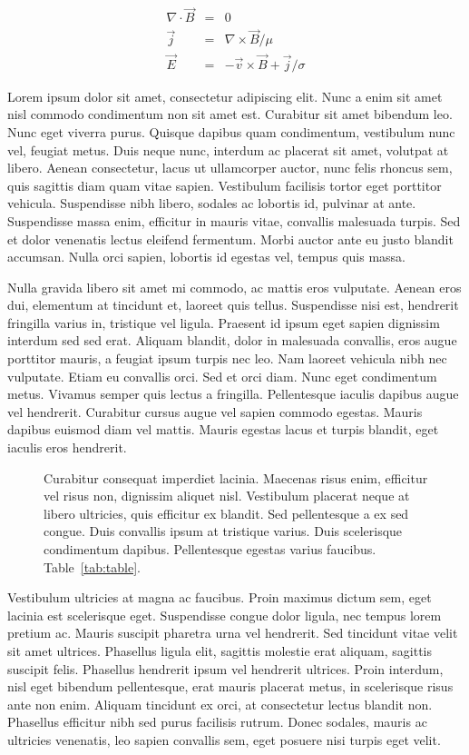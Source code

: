 \documentclass[]{aastex61}
\begin{document}
\begin{eqnarray} \label{eqn:other}
\nabla \cdot \vec{B} &=& 0 \\
\vec{j} &=& \nabla \times \vec{B} / \mu \\
\vec{E} &=& - \vec{v} \times \vec{B} + \vec{j} / \sigma
\end{eqnarray}


Lorem ipsum dolor sit amet, consectetur adipiscing elit. Nunc a enim sit amet nisl commodo condimentum non sit amet est. Curabitur sit amet bibendum leo. Nunc eget viverra purus. Quisque dapibus quam condimentum, vestibulum nunc vel, feugiat metus. Duis neque nunc, interdum ac placerat sit amet, volutpat at libero. Aenean consectetur, lacus ut ullamcorper auctor, nunc felis rhoncus sem, quis sagittis diam quam vitae sapien. Vestibulum facilisis tortor eget porttitor vehicula. Suspendisse nibh libero, sodales ac lobortis id, pulvinar at ante. Suspendisse massa enim, efficitur in mauris vitae, convallis malesuada turpis. Sed et dolor venenatis lectus eleifend fermentum. Morbi auctor ante eu justo blandit accumsan. Nulla orci sapien, lobortis id egestas vel, tempus quis massa.

Nulla gravida libero sit amet mi commodo, ac mattis eros vulputate. Aenean eros dui, elementum at tincidunt et, laoreet quis tellus. Suspendisse nisi est, hendrerit fringilla varius in, tristique vel ligula. Praesent id ipsum eget sapien dignissim interdum sed sed erat. Aliquam blandit, dolor in malesuada convallis, eros augue porttitor mauris, a feugiat ipsum turpis nec leo. Nam laoreet vehicula nibh nec vulputate. Etiam eu convallis orci. Sed et orci diam. Nunc eget condimentum metus. Vivamus semper quis lectus a fringilla. Pellentesque iaculis dapibus augue vel hendrerit. Curabitur cursus augue vel sapien commodo egestas. Mauris dapibus euismod diam vel mattis. Mauris egestas lacus et turpis blandit, eget iaculis eros hendrerit.

\begin{figure}[ht!]
\caption{Curabitur consequat imperdiet lacinia. Maecenas risus enim, efficitur vel risus non, dignissim aliquet nisl. Vestibulum placerat neque at libero ultricies, quis efficitur ex blandit. Sed pellentesque a ex sed congue. Duis convallis ipsum at tristique varius. Duis scelerisque condimentum dapibus. Pellentesque egestas varius faucibus. Table~\ref{tab:table}.}
\label{fig:figure}
\end{figure}

Vestibulum ultricies at magna ac faucibus. Proin maximus dictum sem, eget lacinia est scelerisque eget. Suspendisse congue dolor ligula, nec tempus lorem pretium ac. Mauris suscipit pharetra urna vel hendrerit. Sed tincidunt vitae velit sit amet ultrices. Phasellus ligula elit, sagittis molestie erat aliquam, sagittis suscipit felis. Phasellus hendrerit ipsum vel hendrerit ultrices. Proin interdum, nisl eget bibendum pellentesque, erat mauris placerat metus, in scelerisque risus ante non enim. Aliquam tincidunt ex orci, at consectetur lectus blandit non. Phasellus efficitur nibh sed purus facilisis rutrum. Donec sodales, mauris ac ultricies venenatis, leo sapien convallis sem, eget posuere nisi turpis eget velit.
\end{document}
